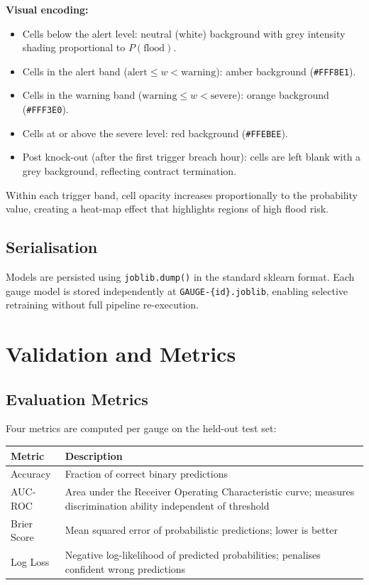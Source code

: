 \documentclass[11pt,a4paper]{article}
\begin{document}
\textbf{Visual encoding:}
\begin{itemize}[nosep]
    \item Cells below the alert level: neutral (white) background with grey
          intensity shading proportional to $P(\text{flood})$.
    \item Cells in the alert band ($\text{alert} \leq w < \text{warning}$):
          amber background (\texttt{\#FFF8E1}).
    \item Cells in the warning band ($\text{warning} \leq w < \text{severe}$):
          orange background (\texttt{\#FFF3E0}).
    \item Cells at or above the severe level: red background (\texttt{\#FFEBEE}).
    \item Post knock-out (after the first trigger breach hour): cells are left
          blank with a grey background, reflecting contract termination.
\end{itemize}

Within each trigger band, cell opacity increases proportionally to the probability
value, creating a heat-map effect that highlights regions of high flood risk.

\subsection{Serialisation}
Models are persisted using \texttt{joblib.dump()} in the standard sklearn format.
Each gauge model is stored independently at \texttt{GAUGE-\{id\}.joblib}, enabling
selective retraining without full pipeline re-execution.

\section{Validation and Metrics}

\subsection{Evaluation Metrics}
Four metrics are computed per gauge on the held-out test set:

\begin{center}
\begin{tabular}{lp{9cm}}
\toprule
\textbf{Metric} & \textbf{Description} \\
\midrule
Accuracy & Fraction of correct binary predictions \\
AUC-ROC & Area under the Receiver Operating Characteristic curve; measures
           discrimination ability independent of threshold \\
Brier Score & Mean squared error of probabilistic predictions; lower is better \\
Log Loss & Negative log-likelihood of predicted probabilities; penalises
           confident wrong predictions \\
\bottomrule
\end{tabular}
\end{center}
\end{document}
